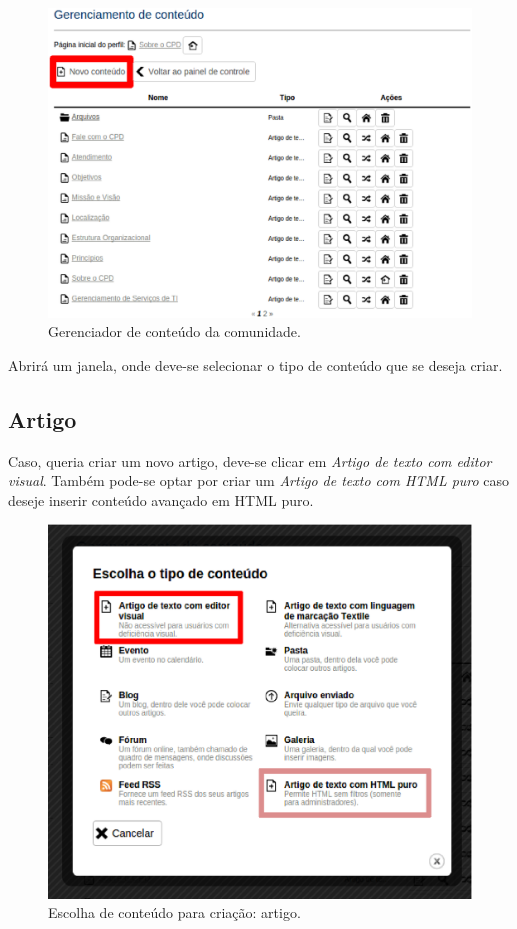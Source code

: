 \begin{figure}[H]
  \centering
    \includegraphics[keepaspectratio=true,scale=0.49]{figuras/novoConteudo.eps}
  \caption{Gerenciador de conteúdo da comunidade.}
  \label{fig:novoConteudo}
\end{figure}

Abrirá um janela, onde deve-se selecionar o tipo de conteúdo que se deseja criar. 

\subsection{Artigo}
\label{subsec:artigo}

Caso, queria criar um novo artigo, deve-se clicar em \emph{\color{red}Artigo de texto com editor visual}. Também pode-se optar por criar um \emph{\color{pink}Artigo de texto com HTML puro} caso deseje inserir conteúdo avançado em HTML puro.

\begin{figure}[H]
  \centering
    \includegraphics[keepaspectratio=true,scale=0.49]{figuras/criandoArtigo.eps}
  \caption{Escolha de conteúdo para criação: artigo.}
  \label{fig:FormCriacaoPasta}
\end{figure}

